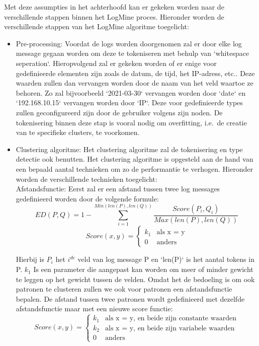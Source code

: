 Met deze assumpties in het achterhoofd kan er gekeken worden naar de verschillende stappen binnen het LogMine proces. Hieronder worden de verschillende stappen van het LogMine algoritme toegelicht:

\begin{itemize}
    \item Pre-processing: Voordat de logs worden doorgenomen zal er door elke log message gegaan worden om deze te tokeniseren met behulp van `whitespace seperation`. Hieropvolgend zal er gekeken worden of er enige voor gedefinieerde elementen zijn zoals de datum, de tijd, het IP-adress, etc.. Deze waarden zullen dan vervangen worden door de naam van het veld waartoe ze behoren. Zo zal bijvoorbeeld `2021-03-30` vervangen worden door `date` en `192.168.10.15` vervangen worden door `IP`. Deze voor gedefinieerde types zullen geconfigureerd zijn door de gebruiker volgens zijn noden. De tokenisering binnen deze stap is vooral nodig om overfitting, i.e.\ de creatie van te specifieke clusters, te voorkomen.\\
    
    \item Clustering algoritme: Het clustering algoritme zal de tokenisering en type detectie ook benutten. Het clustering algoritme is opgesteld aan de hand van een bepaald aantal technieken om zo de performantie te verhogen. Hieronder worden de verschillende technieken toegelicht:\\
    
    \subitem Afstandsfunctie:  Eerst zal er een afstand tussen twee log messages gedefinieerd worden door de volgende formule:
    \[ED(P,Q) = 1 - \sum_{i=1}^{Min(len(P), len(Q))} \frac{Score(P_{i},Q_{i})}{Max(len(P), len(Q))} \]
    \[Score(x,y) = \begin{cases}
        k_{1} & \text{als x = y}\\
        0 & \text{anders}
    \end{cases}\]
    
    Hierbij is \(P_{i}\) het \(i^{de}\) veld van log message P en `len(P)` is het aantal tokens in P. \(k_{1}\) Is een parameter die aangepast kan worden om meer of minder gewicht te leggen op het gewicht tussen de velden. Omdat het de bedoeling is om ook patronen te clusteren zullen we ook voor patronen een afstandsfunctie bepalen. De afstand tussen twee patronen wordt gedefinieerd met dezelfde afstandsfunctie maar met een nieuwe score functie:
    \[Score(x,y) = \begin{cases}
        k_{1} & \text{als x = y, en beide zijn constante waarden}\\
        k_{2} & \text{als x = y, en beide zijn variabele waarden}\\
        0 & \text{anders}
    \end{cases}\]
    

\end{itemize}
